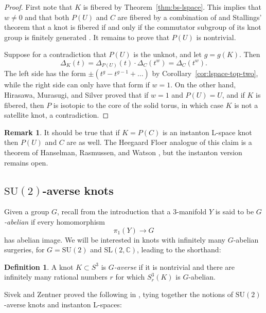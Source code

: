\documentclass[11pt]{amsart}
\numberwithin{equation}{section}
\numberwithin{theorem}{section}
\theoremstyle{definition}
\newtheorem{definition}[theorem]{Definition}
\newtheorem{remark}[theorem]{Remark}
\newcommand{\C}{\mathbb{C}}
\newcommand\SU{\mathrm{SU}}
\newcommand\SL{\mathrm{SL}}
\begin{document}
\begin{proof}
First note that $K$ is fibered by Theorem~\ref{thm:bs-lspace}. This implies that $w\neq 0$ and that both $P(U)$ and $C$ are fibered by a combination of \cite[Corollary~4.15]{burde-zieschang} and Stallings' theorem that a knot is fibered if and only if the commutator subgroup of its knot group is finitely generated \cite[Theorem~5.1]{burde-zieschang}.  It remains to prove that $P(U)$ is nontrivial.

Suppose for a contradiction that $P(U)$ is the unknot, and let $g=g(K)$.  Then
\[ \Delta_K(t) = \Delta_{P(U)}(t) \cdot \Delta_C(t^w) = \Delta_C(t^w). \]
The left side has the form $\pm(t^g - t^{g-1} + \dots)$ by Corollary~\ref{cor:lspace-top-two}, while the right side can only have that form if $w=1$.  On the other hand, Hirasawa, Murasugi, and Silver \cite[Corollary~1]{hms} proved that if $w=1$ and  $P(U)=U$, and if $K$ is fibered, then $P$ is isotopic to the core of the solid torus, in which case $K$ is not a satellite knot, a contradiction.
\end{proof}

\begin{remark}
It should be true that if $K = P(C)$ is an instanton L-space knot then  $P(U)$ and $C$ are as well.  The Heegaard Floer analogue of this claim is a theorem of Hanselman, Rasmussen, and Watson \cite[Theorem~1.15]{hrw}, but the instanton version remains open.
\end{remark}

\subsection{$\SU(2)$-averse knots}

Given a group $G$, recall from the introduction that a 3-manifold $Y$ is said to be  \emph{$G$-abelian} if every homomorphism \[\pi_1(Y)\to G\] has abelian image. We will be interested in knots with infinitely many $G$-abelian  surgeries, for $G = \SU(2)$ and $\SL(2,\C)$, leading to the  shorthand:

\begin{definition}
A  knot $K\subset S^3$ is \emph{$G$-averse} if it is nontrivial and there are infinitely many rational numbers $r$ for which  $S^3_r(K)$ is $G$-abelian.
\end{definition}

Sivek and Zentner proved the following in \cite[Theorem~1.1]{sz-pillowcase}, tying together the notions of $\SU(2)$-averse knots and instanton L-spaces:
\end{document}
